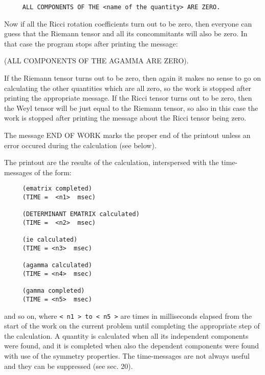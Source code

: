 \bigskip

\begin{verbatim}
     ALL COMPONENTS OF THE <name of the quantity> ARE ZERO.
\end{verbatim}

\bigskip

Now if all the Ricci rotation coefficients turn out  to
     be zero, then everyone can guess that the Riemann tensor and
     all its concommitants will also be zero. In  that  case  the
     program stops after printing the message:

\bigskip

     (ALL COMPONENTS OF THE AGAMMA ARE ZERO).

\bigskip

\noindent If the Riemann tensor turns out to be zero,  then  again  it
     makes  no  sense  to  go on calculating the other quantities
     which are all zero, so the work is  stopped  after  printing
     the appropriate message. If the Ricci tensor turns out to be
     zero, then the Weyl tensor will be just equal to the Riemann
     tensor, so also in this  case  the  work  is  stopped  after
printing the message about the Ricci tensor being zero.

The message END OF WORK marks the  proper  end  of  the
     printout unless an error occured during the calculation (see
     below).

The printout are the results of the calculation,
     interspersed with the time-messages of the form:

\begin{verbatim}
     (ematrix completed)
     (TIME =  <n1>  msec)

     (DETERMINANT EMATRIX calculated)
     (TIME =  <n2>  msec)

     (ie calculated)
     (TIME = <n3>  msec)

     (agamma calculated)
     (TIME = <n4>  msec)

     (gamma completed)
     (TIME = <n5>  msec)

\end{verbatim}

\noindent and so on, where \verb+< n1 > to < n5 >+ are times in  milliseconds
     elapsed  from  the  start of the work on the current problem
     until completing the appropriate step of the calculation.  A
     quantity  is  calculated when all its independent components
were found, and it is completed when also the dependent components were found
with use of the symmetry properties.  The time-messages are not always useful
and they can be suppressed (see sec. 20).

